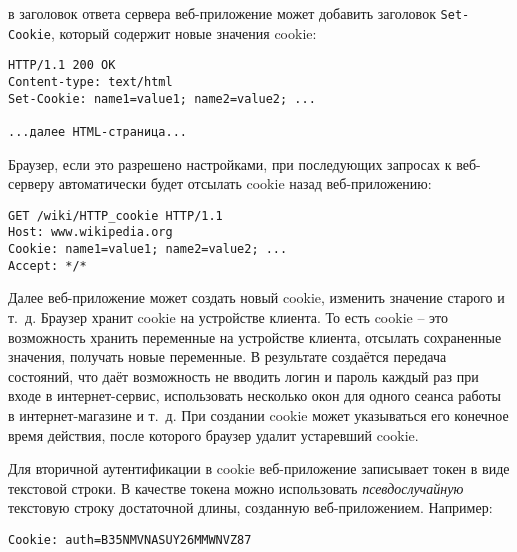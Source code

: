 в заголовок ответа сервера веб-приложение может добавить заголовок \texttt{Set-Cookie}, который содержит новые значения cookie:
\begin{center} \begin{verbatim}
HTTP/1.1 200 OK
Content-type: text/html
Set-Cookie: name1=value1; name2=value2; ...

...далее HTML-страница...
\end{verbatim} \end{center}

Браузер, если это разрешено настройками, при последующих запросах к веб-серверу автоматически будет отсылать cookie назад веб-приложению:
\begin{center} \begin{verbatim}
GET /wiki/HTTP_cookie HTTP/1.1
Host: www.wikipedia.org
Cookie: name1=value1; name2=value2; ...
Accept: */*
\end{verbatim} \end{center}

Далее веб-приложение может создать новый cookie, изменить значение старого и т.~д. Браузер хранит cookie на устройстве клиента. То есть cookie -- это возможность хранить переменные на устройстве клиента, отсылать сохраненные значения, получать новые переменные. В результате создаётся передача состояний, что даёт возможность не вводить логин и пароль каждый раз при входе в интернет-сервис, использовать несколько окон для одного сеанса работы в интернет-магазине и т.~д. При создании cookie может указываться его конечное время действия, после которого браузер удалит устаревший cookie.

Для вторичной аутентификации в cookie веб-приложение записывает токен в виде текстовой строки. В качестве токена можно использовать \emph{псевдослучайную} текстовую строку достаточной длины, созданную веб-приложением. Например:
\begin{center} \begin{verbatim}
Cookie: auth=B35NMVNASUY26MMWNVZ87
\end{verbatim} \end{center}

